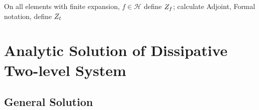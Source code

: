 On all elements with finite expansion, $f \in \mathcal{H}$ define $Z_f$; calculate Adjoint, Formal notation, define $Z_t$


\chapter{Analytic Solution of Dissipative Two-level System}
\label{ch:tla}

\section{General Solution}
\label{sec:tla.general}
%

